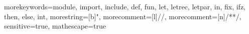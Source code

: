  {
	morekeywords={module, import, include, def, fun, let, letrec, letpar, in, fix,
	ifz, then, else, int}, morestring=[b]",
	morecomment=[l]{//},
	morecomment=[n]{/*}{*/},
  sensitive=true,
  mathescape=true
}


\newcommand{\pcfmcode}[1]{\lstinline[language=PCFM,basicstyle=\lstinlinestyle,breaklines=false]{#1}}
\newcommand{\pcfmcodefig}[1]{\lstinline[language=PCFM,basicstyle=\lstfigurestyle,breaklines=false]{#1}}
\newcommand{\pcfmcodebl}[1]{\lstinline[language=PCFM,basicstyle=\lstinlinestyle,breaklines=true]{#1}}
\newcommand{\PCFM}{\langname{PCFM}}
\newcommand{\pcfmcodemm}[1]{\lstinline[language=PCFM,basicstyle={\color{eclipse-keywords}\fontfamily{pcr}\fontsize{9pt}{11pt}\selectfont},breaklines=true]{#1}}
\newcommand{\pcfmcodecom}[1]{\lstinline[language=PCFM,basicstyle={\color{eclipse-comments}\fontfamily{pcr}\fontsize{9pt}{11pt}\selectfont},breaklines=true]{#1}}
